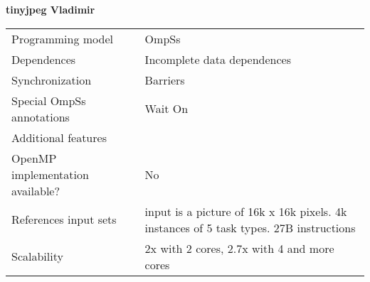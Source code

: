 \section*{}
\label{tinyjpeg_vladimir}
\centering
\Huge
\textbf{tinyjpeg Vladimir}

\begin{table}[h!]
  \large
  \centering
  \begin{tabular}{|l|l|}
    \hline
    Programming model                & OmpSs \\
    Dependences                      & Incomplete data dependences \\
    Synchronization                  & Barriers \\
    Special OmpSs annotations        & Wait On \\
    Additional features              &  \\
    OpenMP implementation available? & No \\
    References input sets            & input is a picture of 16k x 16k pixels. 4k instances of 5 task types. 27B instructions \\
    Scalability                      & 2x with 2 cores, 2.7x with 4 and more cores \\
    \hline
  \end{tabular}
\end{table}

\newpage

